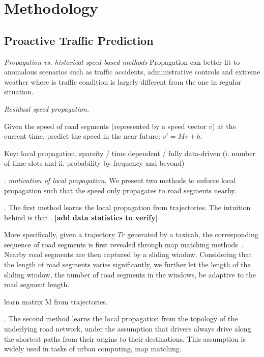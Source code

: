 \section{Methodology}
\label{sec-method}


\subsection{Proactive Traffic Prediction}
\label{subsec-proactive}

{\em Propagation vs. historical speed based methods}
Propagation can better fit to anomalous scenarios such as traffic accidents, administrative controls and extreme weather where is traffic condition is largely different from the one in regular situation.

{\em Residual speed propagation.}

Given the speed of road segments (represented by a speed vector $v$) at the current time, predict the speed in the near future: $v'=Mv+b$.

Key: local propagation, \ie sparsity / time dependent / fully data-driven (i. number of time slots and ii. probability by frequency and beyond)


.
{\em motivation of local propagation.}
We present two methods to enforce local propagation such that the speed only propagates to road segments nearby.

.
The first method learns the local propagation from trajectories. The intuition behind is that {\em }. {\bf [add data statistics to verify]}

More specifically, given a trajectory $Tr$ generated by a taxicab, the corresponding sequence of road segments is first revealed through map matching methods~\cite{Newson2009MM}. Nearby road segments are then captured by a sliding window. Considering that the length of road segments varies significantly, we further let the length of the sliding window, \ie the number of road segments in the windows, be adaptive to the road segment length.

\begin{example}
learn matrix M from trajectories.
\end{example}

.
The second method learns the local propagation from the topology of the underlying road network, under the assumption that drivers always drive along the shortest paths from their origins to their destinations. This assumption is widely used in tasks of urban computing, \eg map matching.

